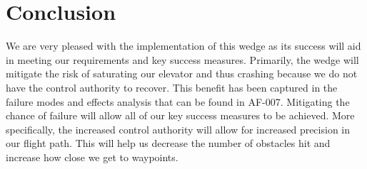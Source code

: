 \documentclass[]{auvsi_doc}
\begin{document}
\section{Conclusion}

We are very pleased with the implementation of this wedge as its success will aid in meeting our requirements and key success measures. Primarily, the wedge will mitigate the risk of saturating our elevator and thus crashing because we do not have the control authority to recover. This benefit has been captured in the failure modes and effects analysis that can be found in AF-007. Mitigating the chance of failure will allow all of our key success measures to be achieved. More specifically, the increased control authority will allow for increased precision in our flight path. This will help us decrease the number of obstacles hit and increase how close we get to waypoints.
\end{document}
